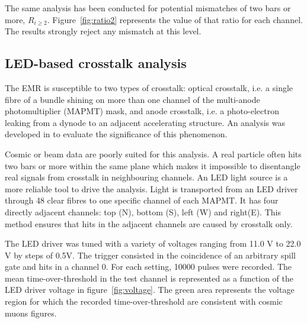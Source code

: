 \documentclass[a4paper,11pt]{article}
\begin{document}
The same analysis has been conducted for potential mismatches of two bars or more, $R_{i\geq2}$. Figure~\ref{fig:ratio2} represents the value of that ratio for each channel. The results strongly reject any mismatch at this level.

\subsection{LED-based crosstalk analysis}\label{sec_xt}
The EMR is susceptible to two types of crosstalk: optical crosstalk, i.e. a single fibre of a bundle shining on more than one channel of the multi-anode photomultiplier (MAPMT) mask, and anode crosstalk, i.e. a photo-electron leaking from a dynode to an adjacent accelerating structure. An analysis was developed in \cite{emr_xt, Francois} to evaluate the significance of this phenomenon.

Cosmic or beam data are poorly suited for this analysis. A real particle often hits two bars or more within the same plane which makes it impossible to disentangle real signals from crosstalk in neighbouring channels. An LED light source is a more reliable tool to drive the analysis. Light is transported from an LED driver through 48 clear fibres to one specific channel of each MAPMT. It has four directly adjacent channels: top (N), bottom (S), left (W) and right(E). This method ensures that hits in the adjacent channels are caused by crosstalk only.

The LED driver was tuned with a variety of voltages ranging from 11.0 V to 22.0 V by steps of 0.5V. The trigger consisted in the coincidence of an arbitrary spill gate and hits in a channel 0. For each setting, 10000 pulses were recorded. The mean time-over-threshold in the test channel is represented as a function of the LED driver voltage in figure~\ref{fig:voltage}. The green area represents the voltage region for which the recorded time-over-threshold are consistent with cosmic muons figures.
\end{document}
